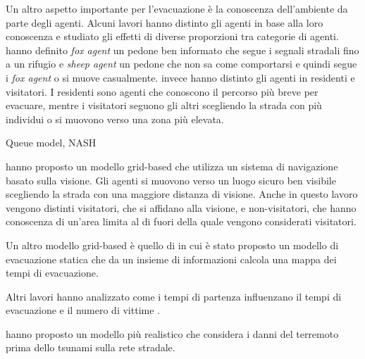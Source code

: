 Un altro aspetto importante per l'evacuazione è la conoscenza dell'ambiente da parte degli agenti.
Alcuni lavori hanno distinto gli agenti in base alla loro conoscenza e
studiato gli effetti di diverse proporzioni tra categorie di agenti.
\textcite{nguyen2012simulation} hanno definito \textit{fox agent} un pedone ben informato che segue i segnali
stradali fino a un rifugio e \textit{sheep agent} un pedone che non sa
come comportarsi e quindi segue i \textit{fox agent} o si muove casualmente.
\textcite{takabatake2017simulated} invece hanno distinto gli agenti in residenti e visitatori.
I residenti sono agenti che conoscono il percorso più breve per evacuare, mentre i visitatori
seguono gli altri scegliendo la strada con più individui o si muovono verso una zona più elevata.

\textbf{\textcite{lammel2010emergency}} Queue model, NASH

\textcite{wijerathne2013hpc} hanno proposto un modello grid-based che utilizza un sistema di navigazione basato
sulla visione. Gli agenti si muovono verso un luogo sicuro ben visibile scegliendo la strada con una maggiore distanza di visione.
%
Anche in questo lavoro vengono distinti visitatori, che si affidano alla visione, e non-visitatori, che hanno conoscenza di un'area
limita al di fuori della quale vengono considerati visitatori.

Un altro modello grid-based è quello di \textcite{mas2012agent} 
in cui è stato proposto un modello di evacuazione statica che da un insieme di informazioni %
calcola una mappa dei tempi di evacuazione.

Altri lavori hanno analizzato come i tempi di partenza influenzano il tempi di evacuazione e il numero di vittime
\parencite{wang2016agent, takabatake2017simulated}.

\textcite{wang2021novel} hanno proposto un modello più realistico che considera i danni del terremoto
prima dello tsunami sulla rete stradale.
